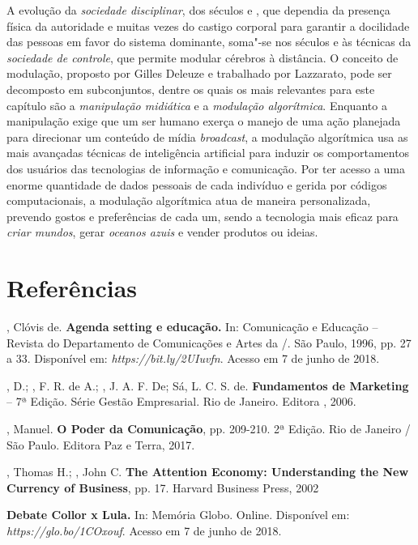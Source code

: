 A evolução da \emph{sociedade disciplinar}, dos séculos  e , que
dependia da presença física da autoridade e muitas vezes do castigo
corporal para garantir a docilidade das pessoas em favor do sistema
dominante, soma"-se nos séculos  e  às técnicas da \emph{sociedade
de controle}, que permite modular cérebros à distância. O conceito de
modulação, proposto por Gilles Deleuze e trabalhado por Lazzarato, pode
ser decomposto em subconjuntos, dentre os quais os mais relevantes para
este capítulo são a \emph{manipulação midiática} e a \emph{modulação
algorítmica}. Enquanto a manipulação exige que um ser humano exerça o
manejo de uma ação planejada para direcionar um conteúdo de mídia
\emph{broadcast}, a modulação algorítmica usa as mais avançadas técnicas
de inteligência artificial para induzir os comportamentos dos usuários
das tecnologias de informação e comunicação. Por ter acesso a uma enorme
quantidade de dados pessoais de cada indivíduo e gerida por códigos
computacionais, a modulação algorítmica atua de maneira personalizada,
prevendo gostos e preferências de cada um, sendo a tecnologia mais
eficaz para \emph{criar mundos}, gerar \emph{oceanos azuis} e vender
produtos ou ideias.

\section{Referências}

, Clóvis de. \textbf{Agenda setting e educação.} In:
Comunicação e Educação -- Revista do Departamento de Comunicações e
Artes da /. São Paulo, 1996, pp. 27 a 33. Disponível em:
\emph{https://bit.ly/2UIuvfn}. Acesso em 7 de junho de 2018.

, D.; , F. R. de A.; , J. A. F. De; Sá, L. C. S. de.
\textbf{Fundamentos de Marketing} -- 7ª Edição. Série Gestão
Empresarial. Rio de Janeiro. Editora , 2006.

, Manuel. \textbf{O Poder da Comunicação}, pp. 209-210. 2ª
Edição. Rio de Janeiro / São Paulo. Editora Paz e Terra, 2017.

, Thomas H.; , John C. \textbf{The Attention Economy:
Understanding the New Currency of Business}, pp. 17. Harvard Business
Press, 2002

\textbf{Debate Collor x Lula.} In: Memória Globo. Online. Disponível em:
\emph{https://glo.bo/1COxouf}. Acesso em 7 de junho de 2018.


